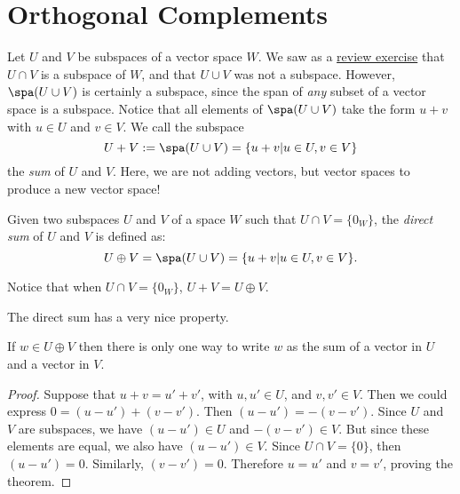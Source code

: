 
\section{Orthogonal Complements}

Let $U$ and $V$ be subspaces of a vector space $W$.  We saw as a \hyperref[UcapV]{review exercise} that $U\cap V$ is a subspace of $W$, and that $U\cup V$ was not a subspace.  However, $\spa (U\cup V)$ is certainly a subspace, since the span of \emph{any} subset of a vector space is a subspace.
Notice that all elements of $\spa (U\cup V)$ take the form $u+v$ with $u\in U$ and $v\in V$.  We call the subspace 
\[
U+V:=\spa (U\cup V) = \{u+v | u\in U, v\in V \}
\] 
the \emph{sum} of $U$ and $V$.  Here, we are not adding vectors, but vector spaces to produce a new vector space!


\begin{definition}
Given two subspaces $U$ and $V$ of a space $W$ such that $U\cap V=\{0_W\}$, the \emph{direct sum} of $U$ and $V$ is defined as:
\[
U \oplus V = \spa (U\cup V)= \{u+v | u\in U, v\in V \}.
\]
\end{definition}
Notice that when $U\cap V= \{0_W\}$, $U+V=U\oplus V$.


The direct sum has a very nice property.

\begin{theorem}
If $w\in U\oplus V$  then 
there is only one way to write \(w\) as the sum of a vector in \(U\) and a vector in \(V\).  
\end{theorem}

\begin{proof}
Suppose that $u+v=u'+v'$, with $u,u'\in U$, and $v,v' \in V$.  Then we could express $0=(u-u')+(v-v')$.  Then $(u-u')=-(v-v')$.  Since $U$ and $V$ are subspaces, we have $(u-u')\in U$ and $-(v-v')\in V$.  But since these elements are equal, we also have $(u-u')\in V$.  Since $U\cap V=\{0\}$, then $(u-u')=0$.  Similarly, $(v-v')=0$. Therefore $u=u'$ and  $v=v'$, proving the theorem. 
\end{proof}


